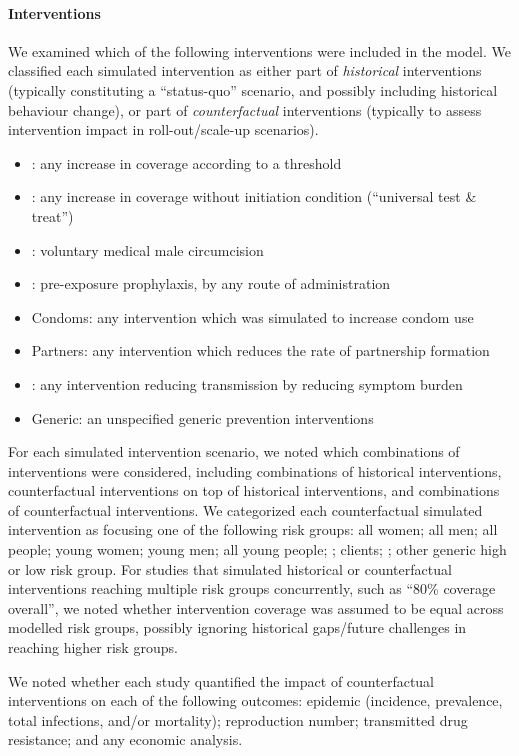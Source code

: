 \paragraph{Interventions}
We examined which of the following interventions were included in the model.
We classified each simulated intervention as either
part of \emph{historical} interventions
(typically constituting a ``status-quo'' scenario,
and possibly including historical behaviour change),
or part of \emph{counterfactual} interventions
(typically to assess intervention impact in roll-out/scale-up scenarios).
\begin{itemize}
  \item \art\cdf: any increase in \art coverage according to a \cdf threshold
  \item \art\utt: any increase in \art coverage without initiation condition
        (``universal test \& treat'')
  \item \vmmc: voluntary medical male circumcision
  \item \prep: pre-exposure prophylaxis, by any route of administration
  \item Condoms: any intervention which was simulated to increase condom use
  \item Partners: any intervention which reduces the rate of partnership formation
  \item \sti: any intervention reducing \hiv transmission by reducing \sti symptom burden
  \item Generic: an unspecified generic \hiv prevention interventions
\end{itemize}
For each simulated intervention scenario,
we noted which combinations of interventions were considered, including
combinations of historical interventions,
counterfactual interventions on top of historical interventions, and
combinations of counterfactual interventions.
We categorized each counterfactual simulated intervention as focusing one of the following risk groups:
all women; all men; all people; young women; young men; all young people;
\fsw; clients; \msm; other generic high or low risk group.
For studies that simulated historical or counterfactual interventions
reaching multiple risk groups concurrently,
such as ``80\% \art coverage overall'',
we noted whether intervention coverage was assumed to be equal across modelled risk groups,
possibly ignoring historical gaps/future challenges in reaching higher risk groups.
\par
We noted whether each study quantified the impact of counterfactual interventions
on each of the following outcomes:
\hiv epidemic (incidence, prevalence, total infections, and/or mortality);
reproduction number;
transmitted drug resistance; and
any economic analysis.
